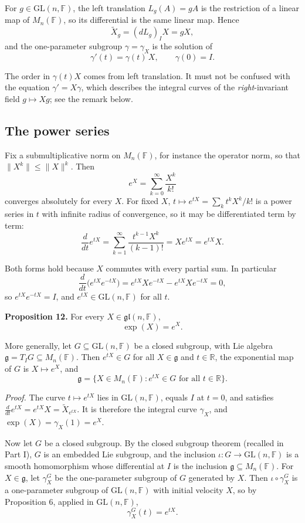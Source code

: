 \documentclass[11pt]{article}
\begin{document}
For $g \in \mathrm{GL}(n, \mathbb{F})$, the left translation $L_g(A) = gA$ is the restriction of a linear map of $M_n(\mathbb{F})$, so its differential is the same linear map. Hence
\[
\widetilde{X}_g = (dL_g)_I X = gX,
\]
and the one-parameter subgroup $\gamma = \gamma_X$ is the solution of
\[
\gamma'(t) = \gamma(t)\, X, \qquad \gamma(0) = I.
\]

The order in $\gamma(t)X$ comes from left translation. It must not be confused with the equation $\gamma' = X\gamma$, which describes the integral curves of the \emph{right}-invariant field $g \mapsto Xg$; see the remark below.

\subsection{The power series}

Fix a submultiplicative norm on $M_n(\mathbb{F})$, for instance the operator norm, so that $\|X^k\| \le \|X\|^k$. Then
\[
e^X = \sum_{k=0}^{\infty} \frac{X^k}{k!}
\]
converges absolutely for every $X$. For fixed $X$, $t \mapsto e^{tX} = \sum_k t^k X^k / k!$ is a power series in $t$ with infinite radius of convergence, so it may be differentiated term by term:
\[
\frac{d}{dt} e^{tX} = \sum_{k=1}^{\infty} \frac{t^{k-1} X^k}{(k-1)!} = X e^{tX} = e^{tX} X.
\]

Both forms hold because $X$ commutes with every partial sum. In particular
\[
\frac{d}{dt}\bigl(e^{tX} e^{-tX}\bigr) = e^{tX} X e^{-tX} - e^{tX} X e^{-tX} = 0,
\]
so $e^{tX} e^{-tX} = I$, and $e^{tX} \in \mathrm{GL}(n, \mathbb{F})$ for all $t$.

\textbf{Proposition 12.} For every $X \in \mathfrak{gl}(n, \mathbb{F})$,
\[
\boxed{\exp(X) = e^X.}
\]

More generally, let $G \subseteq \mathrm{GL}(n, \mathbb{F})$ be a closed subgroup, with Lie algebra $\mathfrak{g} = T_IG \subseteq M_n(\mathbb{F})$. Then $e^{tX} \in G$ for all $X \in \mathfrak{g}$ and $t \in \mathbb{R}$, the exponential map of $G$ is $X \mapsto e^X$, and
\[
\mathfrak{g} = \{ X \in M_n(\mathbb{F}) : e^{tX} \in G \text{ for all } t \in \mathbb{R} \}.
\]

\emph{Proof.} The curve $t \mapsto e^{tX}$ lies in $\mathrm{GL}(n, \mathbb{F})$, equals $I$ at $t = 0$, and satisfies $\frac{d}{dt} e^{tX} = e^{tX} X = \widetilde{X}_{e^{tX}}$. It is therefore the integral curve $\gamma_X$, and $\exp(X) = \gamma_X(1) = e^X$.

Now let $G$ be a closed subgroup. By the closed subgroup theorem (recalled in Part I), $G$ is an embedded Lie subgroup, and the inclusion $\iota : G \to \mathrm{GL}(n, \mathbb{F})$ is a smooth homomorphism whose differential at $I$ is the inclusion $\mathfrak{g} \subseteq M_n(\mathbb{F})$. For $X \in \mathfrak{g}$, let $\gamma^G_X$ be the one-parameter subgroup of $G$ generated by $X$. Then $\iota \circ \gamma^G_X$ is a one-parameter subgroup of $\mathrm{GL}(n, \mathbb{F})$ with initial velocity $X$, so by Proposition 6, applied in $\mathrm{GL}(n, \mathbb{F})$,
\[
\gamma^G_X(t) = e^{tX}.
\]
\end{document}
